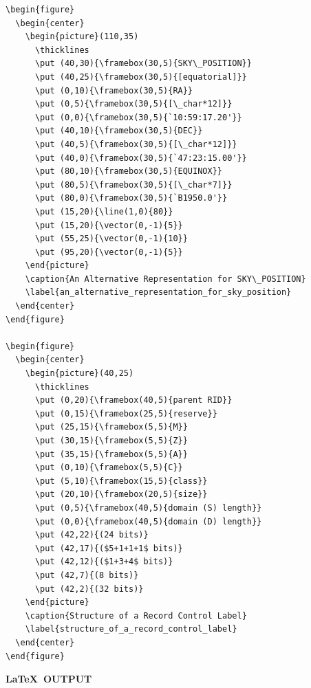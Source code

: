 \documentclass[twoside,11pt]{article}
\begin{document}
\small
\begin{verbatim}
\begin{figure}
  \begin{center}
    \begin{picture}(110,35)
      \thicklines
      \put (40,30){\framebox(30,5){SKY\_POSITION}}
      \put (40,25){\framebox(30,5){[equatorial]}}
      \put (0,10){\framebox(30,5){RA}}
      \put (0,5){\framebox(30,5){[\_char*12]}}
      \put (0,0){\framebox(30,5){`10:59:17.20'}}
      \put (40,10){\framebox(30,5){DEC}}
      \put (40,5){\framebox(30,5){[\_char*12]}}
      \put (40,0){\framebox(30,5){`47:23:15.00'}}
      \put (80,10){\framebox(30,5){EQUINOX}}
      \put (80,5){\framebox(30,5){[\_char*7]}}
      \put (80,0){\framebox(30,5){`B1950.0'}}
      \put (15,20){\line(1,0){80}}
      \put (15,20){\vector(0,-1){5}}
      \put (55,25){\vector(0,-1){10}}
      \put (95,20){\vector(0,-1){5}}
    \end{picture}
    \caption{An Alternative Representation for SKY\_POSITION}
    \label{an_alternative_representation_for_sky_position}
  \end{center}
\end{figure}

\begin{figure}
  \begin{center}
    \begin{picture}(40,25)
      \thicklines
      \put (0,20){\framebox(40,5){parent RID}}
      \put (0,15){\framebox(25,5){reserve}}
      \put (25,15){\framebox(5,5){M}}
      \put (30,15){\framebox(5,5){Z}}
      \put (35,15){\framebox(5,5){A}}
      \put (0,10){\framebox(5,5){C}}
      \put (5,10){\framebox(15,5){class}}
      \put (20,10){\framebox(20,5){size}}
      \put (0,5){\framebox(40,5){domain (S) length}}
      \put (0,0){\framebox(40,5){domain (D) length}}
      \put (42,22){(24 bits)}
      \put (42,17){($5+1+1+1$ bits)}
      \put (42,12){($1+3+4$ bits)}
      \put (42,7){(8 bits)}
      \put (42,2){(32 bits)}
    \end{picture}
    \caption{Structure of a Record Control Label}
    \label{structure_of_a_record_control_label}
  \end{center}
\end{figure}
\end{verbatim}
\normalsize

\newpage

\begin{center}
  \textbf{\LaTeX\ OUTPUT}
\end{center}
\end{document}
